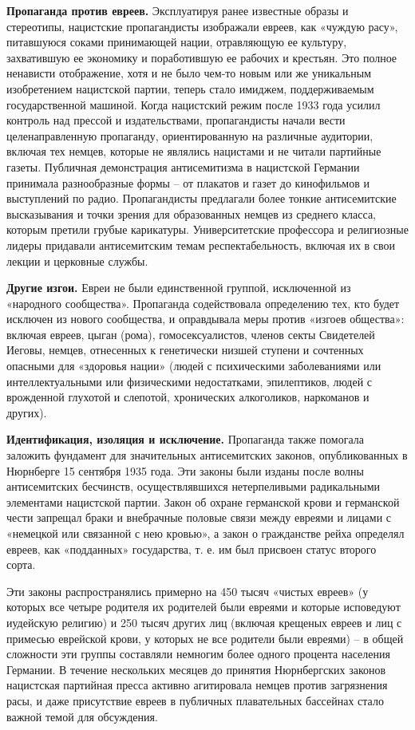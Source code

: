 \textbf{Пропаганда против евреев.} Эксплуатируя ранее известные образы и стереотипы, нацистские пропагандисты изображали евреев, как «чуждую расу», питавшуюся соками принимающей нации, отравляющую ее культуру, захватившую ее экономику и поработившую ее рабочих и крестьян. Это полное ненависти отображение, хотя и не было чем-то новым или же уникальным изобретением нацистской партии, теперь стало имиджем, поддерживаемым государственной машиной. Когда нацистский режим после 1933 года усилил контроль над прессой и издательствами, пропагандисты начали вести целенаправленную пропаганду, ориентированную на различные аудитории, включая тех немцев, которые не являлись нацистами и не читали партийные газеты. Публичная демонстрация антисемитизма в нацистской Германии принимала разнообразные формы – от плакатов и газет до кинофильмов и выступлений по радио. Пропагандисты предлагали более тонкие антисемитские высказывания и точки зрения для образованных немцев из среднего класса, которым претили грубые карикатуры. Университетские профессора и религиозные лидеры придавали антисемитским темам респектабельность, включая их в свои лекции и церковные службы.


\textbf{Другие изгои.} Евреи не были единственной группой, исключенной из «народного сообщества». Пропаганда содействовала определению тех, кто будет исключен из нового сообщества, и оправдывала меры против «изгоев общества»: включая евреев, цыган (рома), гомосексуалистов, членов секты Свидетелей Иеговы, немцев, отнесенных к генетически низшей ступени и сочтенных опасными для «здоровья нации» (людей с психическими заболеваниями или интеллектуальными или физическими недостатками, эпилептиков, людей с врожденной глухотой и слепотой, хронических алкоголиков, наркоманов и других).

\textbf{Идентификация, изоляция и исключение.}  Пропаганда также помогала заложить фундамент для значительных антисемитских законов, опубликованных в Нюрнберге 15 сентября 1935 года. Эти законы были изданы после волны антисемитских бесчинств, осуществлявшихся нетерпеливыми радикальными элементами нацистской партии. Закон об охране германской крови и германской чести запрещал браки и внебрачные половые связи между евреями и лицами с «немецкой или связанной с нею кровью», а закон о гражданстве рейха определял евреев, как «подданных» государства, т. е. им был присвоен статус второго сорта.

Эти законы распространялись примерно на 450 тысяч «чистых евреев» (у которых все четыре родителя их родителей были евреями и которые исповедуют иудейскую религию) и 250 тысяч других лиц (включая крещеных евреев и лиц с примесью еврейской крови, у которых не все родители были евреями) – в общей сложности эти группы составляли немногим более одного процента населения Германии. В течение нескольких месяцев до принятия Нюрнбергских законов нацистская партийная пресса активно агитировала немцев против загрязнения расы, и даже присутствие евреев в публичных плавательных бассейнах стало важной темой для обсуждения.

